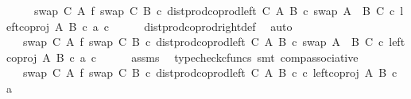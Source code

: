 \begin{isabellebody}
\ \ \ \ {\isacharequal}{\kern0pt}\ {\isacharparenleft}{\kern0pt}{\isacharparenleft}{\kern0pt}swap\ C\ A\ {\isasymbowtie}\isactrlsub f\ swap\ C\ B{\isacharparenright}{\kern0pt}\ {\isasymcirc}\isactrlsub c\ dist{\isacharunderscore}{\kern0pt}prod{\isacharunderscore}{\kern0pt}coprod{\isacharunderscore}{\kern0pt}left\ C\ A\ B\ {\isasymcirc}\isactrlsub c\ swap\ {\isacharparenleft}{\kern0pt}A\ {\isasymCoprod}\ B{\isacharparenright}{\kern0pt}\ C{\isacharparenright}{\kern0pt}\ {\isasymcirc}\isactrlsub c\ {\isasymlangle}left{\isacharunderscore}{\kern0pt}coproj\ A\ B\ {\isasymcirc}\isactrlsub c\ a{\isacharcomma}{\kern0pt}\ c{\isasymrangle}{\isachardoublequoteclose}\isanewline
\ \ \ \ \isamarkupfalse%
\ dist{\isacharunderscore}{\kern0pt}prod{\isacharunderscore}{\kern0pt}coprod{\isacharunderscore}{\kern0pt}right{\isacharunderscore}{\kern0pt}def\ \isamarkupfalse%
\ auto\isanewline
\ \ \isamarkupfalse%
\ \isamarkupfalse%
\ {\isachardoublequoteopen}{\isachardot}{\kern0pt}{\isachardot}{\kern0pt}{\isachardot}{\kern0pt}\ {\isacharequal}{\kern0pt}\ {\isacharparenleft}{\kern0pt}swap\ C\ A\ {\isasymbowtie}\isactrlsub f\ swap\ C\ B{\isacharparenright}{\kern0pt}\ {\isasymcirc}\isactrlsub c\ dist{\isacharunderscore}{\kern0pt}prod{\isacharunderscore}{\kern0pt}coprod{\isacharunderscore}{\kern0pt}left\ C\ A\ B\ {\isasymcirc}\isactrlsub c\ swap\ {\isacharparenleft}{\kern0pt}A\ {\isasymCoprod}\ B{\isacharparenright}{\kern0pt}\ C\ {\isasymcirc}\isactrlsub c\ {\isasymlangle}left{\isacharunderscore}{\kern0pt}coproj\ A\ B\ {\isasymcirc}\isactrlsub c\ a{\isacharcomma}{\kern0pt}\ c{\isasymrangle}{\isachardoublequoteclose}\isanewline
\ \ \ \ \isamarkupfalse%
\ assms\ \isamarkupfalse%
\ {\isacharparenleft}{\kern0pt}typecheck{\isacharunderscore}{\kern0pt}cfuncs{\isacharcomma}{\kern0pt}\ smt\ comp{\isacharunderscore}{\kern0pt}associative{}{\isacharparenright}{\kern0pt}\isanewline
\ \ \isamarkupfalse%
\ \isamarkupfalse%
\ {\isachardoublequoteopen}{\isachardot}{\kern0pt}{\isachardot}{\kern0pt}{\isachardot}{\kern0pt}\ {\isacharequal}{\kern0pt}\ {\isacharparenleft}{\kern0pt}swap\ C\ A\ {\isasymbowtie}\isactrlsub f\ swap\ C\ B{\isacharparenright}{\kern0pt}\ {\isasymcirc}\isactrlsub c\ dist{\isacharunderscore}{\kern0pt}prod{\isacharunderscore}{\kern0pt}coprod{\isacharunderscore}{\kern0pt}left\ C\ A\ B\ {\isasymcirc}\isactrlsub c\ {\isasymlangle}c{\isacharcomma}{\kern0pt}\ left{\isacharunderscore}{\kern0pt}coproj\ A\ B\ {\isasymcirc}\isactrlsub c\ a{\isasymrangle}{\isachardoublequoteclose}\isanewline

\end{isabellebody}
